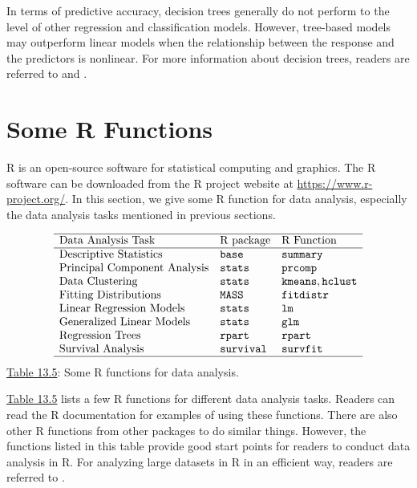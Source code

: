 \documentclass[]{book}
\theoremstyle{definition}
\theoremstyle{definition}
\theoremstyle{definition}
\theoremstyle{remark}
\begin{document}
In terms of predictive accuracy, decision trees generally do not perform
to the level of other regression and classification models. However,
tree-based models may outperform linear models when the relationship
between the response and the predictors is nonlinear. For more
information about decision trees, readers are referred to
\citep{breiman1984} and \citep{mitchell1997}.

\section{Some R Functions}\label{some-r-functions}

R is an open-source software for statistical computing and graphics. The
R software can be downloaded from the R project website at
\url{https://www.r-project.org/}. In this section, we give some R
function for data analysis, especially the data analysis tasks mentioned
in previous sections.

\[\begin{matrix}
\begin{array}{lll} \hline
\text{Data Analysis Task} & \text{R package} & \text{R Function} \\\hline
\text{Descriptive Statistics} & \texttt{base} & \texttt{summary}\\
\text{Principal Component Analysis} & \texttt{stats} & \texttt{prcomp} \\
\text{Data Clustering} & \texttt{stats} & \texttt{kmeans}, \texttt{hclust} \\
\text{Fitting Distributions} & \texttt{MASS} & \texttt{fitdistr} \\
\text{Linear Regression Models} & \texttt{stats} & \texttt{lm} \\
\text{Generalized Linear Models} & \texttt{stats} & \texttt{glm} \\
\text{Regression Trees} & \texttt{rpart} & \texttt{rpart} \\
\text{Survival Analysis} & \texttt{survival} & \texttt{survfit} \\
\hline
\end{array}
\end{matrix}
\] \protect\hyperlink{tab:13.5}{Table 13.5}: Some R functions for data
analysis.

\protect\hyperlink{tab:13.5}{Table 13.5} lists a few R functions for
different data analysis tasks. Readers can read the R documentation for
examples of using these functions. There are also other R functions from
other packages to do similar things. However, the functions listed in
this table provide good start points for readers to conduct data
analysis in R. For analyzing large datasets in R in an efficient way,
readers are referred to \citep{daroczi2015}.
\end{document}
